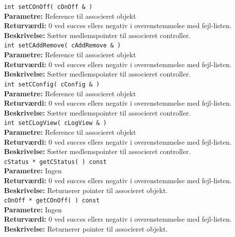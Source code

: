 \verb+int setCOnOff( cOnOff & )+\\
\textbf{Parametre:} Reference til associeret objekt \\
\textbf{Returværdi:} 0 ved succes ellers negativ i overenstemmelse med fejl-listen. \\
\textbf{Beskrivelse:} Sætter medlemspointer til associeret controller.\\

\verb+int setCAddRemove( cAddRemove & )+\\
\textbf{Parametre:} Reference til associeret objekt \\
\textbf{Returværdi:} 0 ved succes ellers negativ i overenstemmelse med fejl-listen. \\
\textbf{Beskrivelse:} Sætter medlemspointer til associeret controller.\\

\verb+int setCConfig( cConfig & )+\\
\textbf{Parametre:} Reference til associeret objekt \\
\textbf{Returværdi:} 0 ved succes ellers negativ i overenstemmelse med fejl-listen. \\
\textbf{Beskrivelse:} Sætter medlemspointer til associeret controller.\\

\verb+int setCLogView( cLogView & )+\\
\textbf{Parametre:} Reference til associeret objekt \\
\textbf{Returværdi:} 0 ved succes ellers negativ i overenstemmelse med fejl-listen. \\
\textbf{Beskrivelse:} Sætter medlemspointer til associeret controller.\\

\verb+cStatus * getCStatus( ) const+\\
\textbf{Parametre:} Ingen \\
\textbf{Returværdi:} 0 ved succes ellers negativ i overenstemmelse med fejl-listen. \\
\textbf{Beskrivelse:} Returnerer pointer til associeret objekt.\\

\verb+cOnOff * getCOnOff( ) const+\\
\textbf{Parametre:} Ingen \\
\textbf{Returværdi:} 0 ved succes ellers negativ i overenstemmelse med fejl-listen. \\
\textbf{Beskrivelse:} Returnerer pointer til associeret objekt.\\

